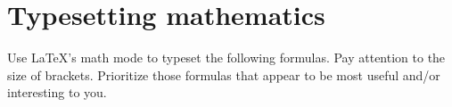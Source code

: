 \section{Typesetting mathematics}

Use \LaTeX{}'s math mode to typeset the following formulas.
Pay attention to the size of brackets. Prioritize those formulas that appear to be most useful and/or interesting to you.